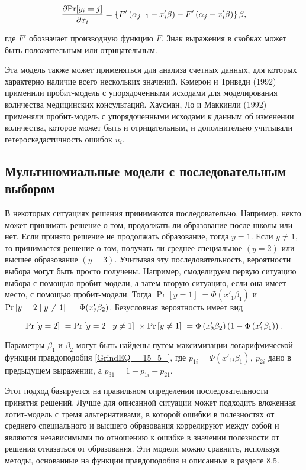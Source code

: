\[\frac{\partial {\rm Pr}[y_i=j]}{\partial x_i}=\left\{F'\left({\alpha }_{j-1}-x'_i\beta \right)-F'\left({\alpha }_j-x'_i\beta \right)\right\}\beta ,\] 

где $F'$ обозначает производную функцию $F$. Знак выражения в скобках может быть положительным или отрицательным.

Эта модель также может применяться для анализа счетных данных, для которых характерно наличие всего нескольких значений. Кэмерон и Триведи (1992) применили пробит-модель с упорядоченными исходами для моделирования количества медицинских консультаций. Хаусман, Ло и Маккинли (1992) применяли пробит-модель с упорядоченными исходами к данным об изменении количества, которое может быть и отрицательным, и дополнительно учитывали гетероскедастичность ошибок $u_i$.

\subsection{Мультиномиальные модели с последовательным выбором}

В некоторых ситуациях решения принимаются  последовательно. Например, некто может принимать решение о том, продолжать ли образование после школы или нет. Если принято решение не продолжать образование, тогда $y=1$. Если $y\ne 1$, то принимается решение о том, получать ли среднее специальное $\left(y=2\right)$ или высшее образование $\left(y=3\right)$. Учитывая эту последовательность, вероятности выбора могут быть просто получены. Например, смоделируем первую ситуацию выбора с помощью пробит-модели, а затем вторую ситуацию, если она имеет место, с помощью пробит-модели. Тогда ${\Pr  \left[y=1\right]\ }=\Phi (x'_1{\beta }_1)$ и ${\Pr  \left[y=2\mathrel{\left|\vphantom{y=2 y\ne 1}\right.\kern-\nulldelimiterspace}y\ne 1\right]\ }=\Phi (x'_2{\beta }_2)$. Безусловная вероятность имеет вид

\[{\Pr  \left[y=2\right]\ }={\Pr  \left[y=2\mathrel{\left|\vphantom{y=2 y\ne 1}\right.\kern-\nulldelimiterspace}y\ne 1\right]\ }\times {\Pr  \left[y\ne 1\right]\ }=\Phi \left(x'_2{\beta }_2\right)\left(1-\Phi \left(x'_1{\beta }_1\right)\right).\] 

Параметры ${\beta }_1$ и ${\beta }_2$ могут быть найдены путем максимизации логарифмической функции правдоподобия \eqref{GrindEQ__15_5_}, где $p_{1i}=\Phi \left(x'_{1i}{\beta }_1\right),\ p_{2i}$ дано в предыдущем выражении, а $p_{31}=1-p_{1i}-p_{21}$.

Этот подход базируется на правильном определении последовательности принятия решений. Лучше  для описанной ситуации  может подходить вложенная логит-модель с тремя альтернативами, в которой ошибки в полезностях от среднего специального и высшего образования коррелируют между собой и являются независимыми по отношению к ошибке в значении полезности от решения отказаться от образования. Эти модели можно сравнить, используя методы, основанные на  функции правдоподобия и описанные в разделе 8.5. 

